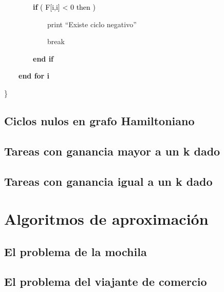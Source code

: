 \documentclass[a4paper,10pt]{article}
\begin{document}
\textcolor{black}{\ \ \ \ \ \ \ \ }\textbf{\textcolor[rgb]{0.0,0.5019608,0.0}{if}}\textcolor{black}{ ( F[i,i] < 0 then )}
	
\textcolor{black}{\ \ \ \ \ \ \ \ \ \ \ \ }print “Existe ciclo negativo”
		
\textcolor{black}{\ \ \ \ \ \ \ \ \ \ \ \ }break
		
\textcolor{black}{\ \ \ \ \ \ \ \ }\textbf{\textcolor[rgb]{0.0,0.5019608,0.0}{end if}}
	
\textcolor{black}{\ \ \ \ }\textbf{\textcolor[rgb]{0.0,0.5019608,0.0}{end for i}}

\}


\subsection{Ciclos nulos en grafo Hamiltoniano}

\subsection{Tareas con ganancia mayor a un k dado}

\subsection{Tareas con ganancia igual a un k dado}


\section{Algoritmos de aproximación}


\subsection{El problema de la mochila}










\subsection{El problema del viajante de comercio}
\end{document}

